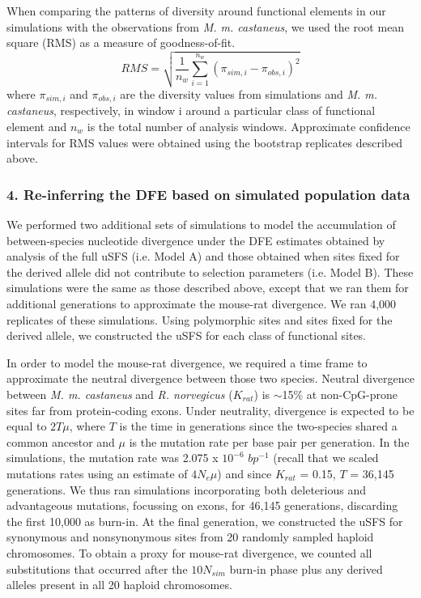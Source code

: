 When comparing the patterns of diversity around functional elements in our simulations with the observations from \textit{M. m. castaneus}, we used the root mean square (RMS) as a measure of goodness-of-fit. 
\begin{equation}
RMS = \sqrt{  \frac{1}{n_w}  \sum_{i=1}^{n_w} (\pi_{sim,i} - \pi_{obs,i})^2  }
\end{equation}
\noindent
where $\pi_{sim,i}$ and $\pi_{obs,i}$ are the diversity values from simulations and \textit{M. m. castaneus}, respectively, in window i around a particular class of functional element and $n_w$ is the total number of analysis windows. Approximate confidence intervals for RMS values were obtained using the bootstrap replicates described above.

\subsubsection{4. Re-inferring the DFE based on simulated population data}

	We performed two additional sets of simulations to model the accumulation of between-species nucleotide divergence under the DFE estimates obtained by analysis of the full uSFS (i.e. Model A) and those obtained when sites fixed for the derived allele did not contribute to selection parameters (i.e. Model B). These simulations were the same as those described above, except that we ran them for additional generations to approximate the mouse-rat divergence. We ran 4,000 replicates of these simulations. Using polymorphic sites and sites fixed for the derived allele, we constructed the uSFS for each class of functional sites. 

	In order to model the mouse-rat divergence, we required a time frame to approximate the neutral divergence between those two species. Neutral divergence between \textit{M. m. castaneus} and \textit{R. norvegicus} ($K_{rat}$) is $\sim$15\% at non-CpG-prone sites far from protein-coding exons. Under neutrality, divergence is expected to be equal to $2T\mu$, where $T$ is the time in generations since the two-species shared a common ancestor and $\mu$ is the mutation rate per base pair per generation. In the simulations, the mutation rate was 2.075 x $10^{-6}$ $bp^{-1}$ (recall that we scaled mutations rates using an estimate of $4N_e\mu$) and since $K_{rat}$ = 0.15, $T$ = 36,145 generations. We thus ran simulations incorporating both deleterious and advantageous mutations, focussing on exons, for 46,145 generations, discarding the first 10,000 as burn-in. At the final generation, we constructed the uSFS for synonymous and nonsynonymous sites from 20 randomly sampled haploid chromosomes. To obtain a proxy for mouse-rat divergence, we counted all substitutions that occurred after the $10N_{sim}$ burn-in phase plus any derived alleles present in all 20 haploid chromosomes.

